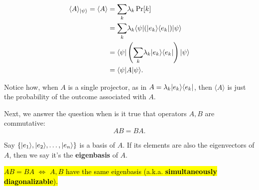 \documentclass[12pt]{article}
\begin{document}
\begin{definition} \label{def:exp-A}
$$
\begin{aligned}
\langle A\rangle_{\Ket{\psi}} = \langle A\rangle
    &= \underset{k}{\sum}\lambda_k \Pr[k]\\
    &= \underset{k}{\sum}\lambda_k \Bra{\psi} (\kb{e_k}{e_k})\Ket{\psi}\\
    &= \Bra{\psi}\prt{\underset{k}{\sum}\lambda_k  \kb{e_k}{e_k}}\Ket{\psi}\\
    &= \Bra{\psi}A\Ket{\psi}.
\end{aligned}
$$

\noindent Notice how, when $A$ is a single projector, as in $A = \lambda_k\Ket{e_k}\Bra{e_k}$, then $\langle A\rangle$ is just the probability of the outcome associated with $A$.\\

\end{definition}

\noindent Next, we answer the question when is it true that operators $A,B$ are commutative: $$
AB = BA.
$$

\begin{definition}
Say $\{\Ket{e_1}, \Ket{e_2}, \ldots, \Ket{e_n}\}$ is a basis of $A$. If its elements are also the eigenvectors of $A$, then we say it's the \textbf{eigenbasis} of $A$.
\end{definition}

\begin{theorem}\label{thm:condition-AB-is-commutative}
\hl{$AB = BA$ $\iff$ $A,B$ have the same eigenbasis (a.k.a. \textbf{simultaneously diagonalizable}).}
\end{theorem}
\end{document}
